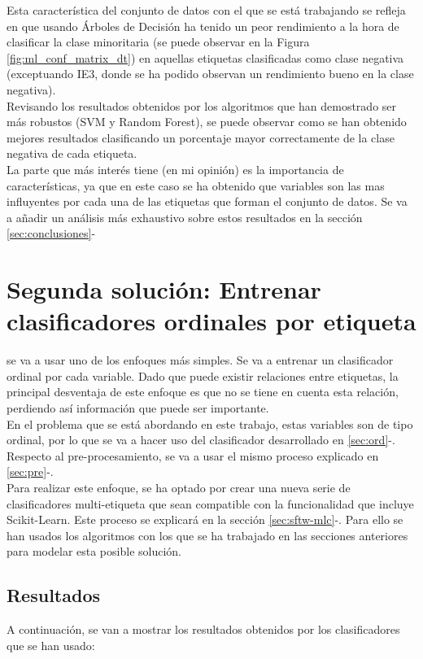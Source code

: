Esta característica del conjunto de datos con el que se está trabajando se refleja en que usando Árboles de Decisión ha tenido un peor rendimiento a la hora de clasificar la clase minoritaria (se puede observar en la Figura \ref{fig:ml_conf_matrix_dt}) en aquellas etiquetas clasificadas como clase negativa (exceptuando IE3, donde se ha podido observan un rendimiento bueno en la clase negativa).\\
Revisando los resultados obtenidos por los algoritmos que han demostrado ser más robustos (SVM y Random Forest), se puede observar como se han obtenido mejores resultados clasificando un porcentaje mayor correctamente de la clase negativa de cada etiqueta.\\
\linebreak
La parte que más interés tiene (en mi opinión) es la importancia de características, ya que en este caso se ha obtenido que variables son las mas influyentes por cada una de las etiquetas que forman el conjunto de datos. Se va a añadir un análisis más exhaustivo sobre estos resultados en la sección \ref{sec:conclusiones}-
\clearpage
\section{Segunda solución: Entrenar clasificadores ordinales por etiqueta}
se va a usar uno de los enfoques más simples. Se va a entrenar un clasificador ordinal por cada variable.
Dado que puede existir relaciones entre etiquetas, la principal desventaja de este enfoque es que no se tiene en cuenta esta relación, perdiendo así información que puede ser importante.\\
\linebreak
En el problema que se está abordando en este trabajo, estas variables son de tipo ordinal, por lo que se va a hacer uso del clasificador desarrollado en \ref{sec:ord}-.
Respecto al pre-procesamiento, se va a usar el mismo proceso explicado en \ref{sec:pre}-.\\

Para realizar este enfoque, se ha optado por crear una nueva serie de clasificadores multi-etiqueta que sean compatible con la funcionalidad que incluye Scikit-Learn. Este proceso se explicará en la sección \ref{sec:sftw-mlc}-. Para ello se han usados los algoritmos con los que se ha trabajado en las secciones anteriores para modelar esta posible solución.
\subsection{Resultados}
A continuación, se van a mostrar los resultados obtenidos por los clasificadores que se han usado:
